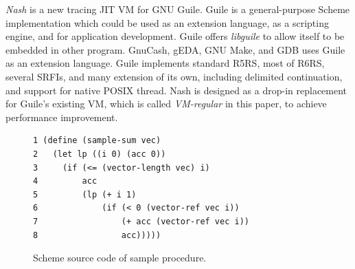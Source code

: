 \documentclass[preprint, numbers]{sigplanconf}
\begin{document}
\textit{Nash} is a new tracing JIT VM for GNU Guile\cite{gnuguile}. Guile is a
general-purpose Scheme implementation which could be used as an extension
language, as a scripting engine, and for application development. Guile offers
\textit{libguile} to allow itself to be embedded in other program. GnuCash,
gEDA, GNU Make, and GDB uses Guile as an extension
language\cite{gnuguile}. Guile implements standard
R5RS\cite{abelson1998revised5}, most of R6RS\cite{sperber2010revised}, several
SRFIs, and many extension of its own, including delimited continuation, and
support for native POSIX thread\cite{guileref}. Nash is designed as a drop-in
replacement for Guile's existing VM, which is called \textit{VM-regular} in
this paper, to achieve performance improvement.

\begin{figure}
  \centering
\begin{verbatim}
1 (define (sample-sum vec)
2   (let lp ((i 0) (acc 0))
3     (if (<= (vector-length vec) i)
4         acc
5         (lp (+ i 1)
6             (if (< 0 (vector-ref vec i))
7                 (+ acc (vector-ref vec i))
8                 acc)))))
\end{verbatim}
\caption{Scheme source code of sample procedure.}
\label{fig:scmloop}
\end{figure}
\end{document}
